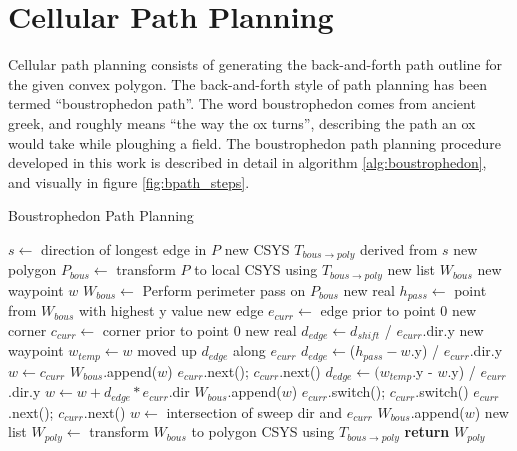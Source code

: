 \section{Cellular Path Planning}
Cellular path planning consists of generating the back-and-forth path outline for the given convex polygon.
The back-and-forth style of path planning has been termed ``boustrophedon path''.
The word boustrophedon comes from ancient greek, and roughly means ``the way the ox turns'', describing the path an ox would take while ploughing a field.
The boustrophedon path planning procedure developed in this work is described in detail in algorithm \ref{alg:boustrophedon}, and visually in figure \ref{fig:bpath_steps}.

\begin{algorithm}[!htbp]
\caption{Boustrophedon Path Planning}\label{alg:boustrophedon}
\begin{algorithmic}[1]
		\State $s \leftarrow$ direction of longest edge in $P$
	\EndIf
	\State new CSYS $T_{bous\rightarrow poly}$ derived from $s$
	\State new polygon $P_{bous} \leftarrow$ transform $P$ to local CSYS using $T_{bous\rightarrow poly}$
	\State new list $W_{bous}$ 
	\State new waypoint $w$
	\State $W_{bous} \leftarrow$ Perform perimeter pass on $P_{bous}$
	\State new real $h_{pass} \leftarrow$ point from $W_{bous}$ with highest y value
	\State new edge $e_{curr} \leftarrow$ edge prior to point 0
	\State new corner $c_{curr} \leftarrow$ corner prior to point 0
		\State new real $d_{edge} \leftarrow d_{shift}$ / $e_{curr}$.dir.y
		\State new waypoint $w_{temp} \leftarrow w$ moved up $d_{edge}$ along $e_{curr}$
			\State $d_{edge} \leftarrow $($h_{pass} - w$.y) / $e_{curr}$.dir.y
			\State $w \leftarrow c_{curr}$
			\State $W_{bous}$.append($w$)
			\State $e_{curr}$.next(); $c_{curr}$.next()
			\State $d_{edge} \leftarrow (w_{temp}$.y - $w$.y) / $e_{curr}$.dir.y
		\EndIf
		\State $w \leftarrow w + d_{edge} * e_{curr}$.dir
		\State $W_{bous}$.append($w$)
		\State $e_{curr}$.switch(); $c_{curr}$.switch()
			\State $e_{curr}$.next(); $c_{curr}$.next()
		\EndIf
		\State $w \leftarrow$ intersection of sweep dir and $e_{curr}$
		\State $W_{bous}$.append($w$)
	\EndWhile
	\State new list $W_{poly} \leftarrow$ transform $W_{bous}$ to polygon CSYS using $T_{bous\rightarrow poly}$
	\State \textbf{return} $W_{poly}$
\EndFunction
\end{algorithmic}
\end{algorithm}

